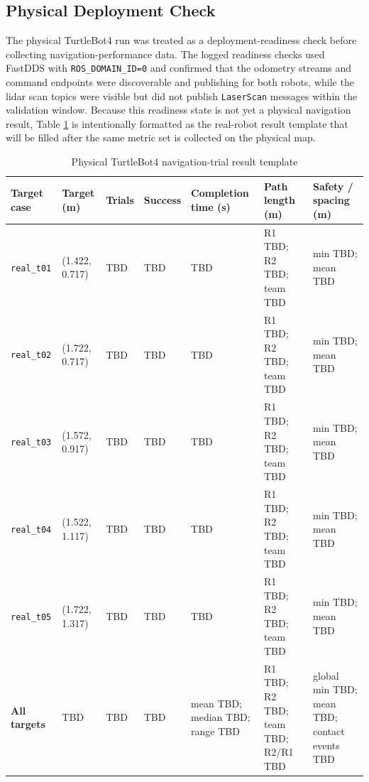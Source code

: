 \documentclass{ieeeaccess}
\begin{document}
\subsection{Physical Deployment Check}
The physical TurtleBot4 run was treated as a deployment-readiness check before collecting navigation-performance data. The logged readiness checks used FastDDS with \texttt{ROS\_DOMAIN\_ID=0} and confirmed that the odometry streams and command endpoints were discoverable and publishing for both robots, while the lidar scan topics were visible but did not publish \texttt{LaserScan} messages within the validation window. Because this readiness state is not yet a physical navigation result, Table \ref{tab_real_check} is intentionally formatted as the real-robot result template that will be filled after the same metric set is collected on the physical map.

\begin{table}[!t]
\caption{Physical TurtleBot4 navigation-trial result template}
\label{tab_real_check}
\centering
{\scriptsize
\setlength{\tabcolsep}{2pt}
\renewcommand{\arraystretch}{1.08}
\begin{tabular}{@{}p{}p{}p{}p{}p{}p{}p{}@{}}
\hline
\textbf{Target case} & \textbf{Target (m)} & \textbf{Trials} & \textbf{Success} & \textbf{Completion time (s)} & \textbf{Path length (m)} & \textbf{Safety / spacing (m)} \\
\hline
\texttt{real\_t01} & (1.422, 0.717) & TBD & TBD & TBD & R1 TBD; R2 TBD; team TBD & min TBD; mean TBD \\
\texttt{real\_t02} & (1.722, 0.717) & TBD & TBD & TBD & R1 TBD; R2 TBD; team TBD & min TBD; mean TBD \\
\texttt{real\_t03} & (1.572, 0.917) & TBD & TBD & TBD & R1 TBD; R2 TBD; team TBD & min TBD; mean TBD \\
\texttt{real\_t04} & (1.522, 1.117) & TBD & TBD & TBD & R1 TBD; R2 TBD; team TBD & min TBD; mean TBD \\
\texttt{real\_t05} & (1.722, 1.317) & TBD & TBD & TBD & R1 TBD; R2 TBD; team TBD & min TBD; mean TBD \\
\hline
\textbf{All targets} & TBD & TBD & TBD & mean TBD; median TBD; range TBD & R1 TBD; R2 TBD; team TBD; R2/R1 TBD & global min TBD; mean TBD; contact events TBD \\
\hline
\end{tabular}
}
\end{table}
\end{document}
